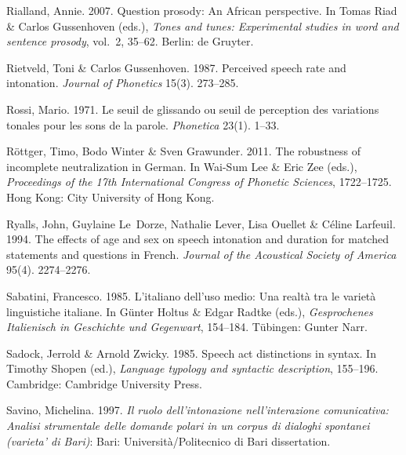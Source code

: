 \documentclass[ number=1
,series=labphon
,output=long
,url=http://langsci-press.org/catalog/book/16
,isbn=978-3-944675-01-5
]{LSP/langsci}
\begin{document}
\begin{thebibliography}{284}
\enlargethispage{2\baselineskip}
Rialland, Annie. 2007.
\newblock Question prosody: {A}n {A}frican perspective.
\newblock In Tomas Riad \& Carlos Gussenhoven (eds.), \emph{Tones and tunes:
  {E}xperimental studies in word and sentence prosody}, vol.~2, 35--62. Berlin:
  de Gruyter.

Rietveld, Toni \& Carlos Gussenhoven. 1987.
\newblock Perceived speech rate and intonation.
\newblock \emph{Journal of Phonetics} 15(3). 273--285.

Rossi, Mario. 1971.
\newblock Le seuil de glissando ou seuil de perception des variations tonales
  pour les sons de la parole.
\newblock \emph{Phonetica} 23(1). 1--33.

R{\"o}ttger, Timo, Bodo Winter \& Sven Grawunder. 2011.
\newblock The robustness of incomplete neutralization in {G}erman.
\newblock In Wai-Sum Lee \& Eric Zee (eds.), \emph{Proceedings of the 17th
  {I}nternational {C}ongress of {P}honetic {S}ciences}, 1722--1725. Hong Kong:
  City University of Hong Kong.

Ryalls, John, Guylaine Le~Dorze, Nathalie Lever, Lisa Ouellet \& Céline
  Larfeuil. 1994.
\newblock The effects of age and sex on speech intonation and duration for
  matched statements and questions in {F}rench.
\newblock \emph{Journal of the Acoustical Society of America} 95(4).
  2274--2276.

Sabatini, Francesco. 1985.
\newblock L'italiano dell'uso medio: {U}na realt{\`a} tra le variet{\`a}
  linguistiche italiane.
\newblock In Günter Holtus \& Edgar Radtke (eds.), \emph{Gesprochenes
  {I}talienisch in {G}eschichte und {G}egenwart}, 154--184. T{\"u}bingen:
  Gunter Narr.

Sadock, Jerrold \& Arnold Zwicky. 1985.
\newblock Speech act distinctions in syntax.
\newblock In Timothy Shopen (ed.), \emph{Language typology and syntactic
  description}, 155--196. Cambridge: Cambridge University Press.

Savino, Michelina. 1997.
\newblock \emph{Il ruolo dell'intonazione nell'interazione comunicativa:
  {A}nalisi strumentale delle domande polari in un corpus di dialoghi spontanei
  (varieta' di {B}ari)}: Bari: Universit{\`a}/{P}olitecnico di {B}ari
  dissertation.


\end{thebibliography}
\end{document}

